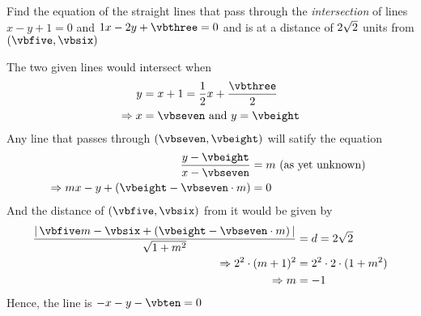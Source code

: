 \question[4] Find the equation of the straight lines that pass through the \textit{intersection} of lines 
$x-y+1 = 0$ and $\vbone x - \vbtwo y + \vbthree = 0$ and is at a distance of 
$2\sqrt{2}$ units from $(\vbfive, \vbsix)$


\watchout

\ifprintanswers

\fi 

\begin{solution}[\halfpage]
	The two given lines would intersect when
	\begin{align}
		y &= x + 1 = \dfrac{\vbone}{\vbtwo}x + \dfrac{\vbthree}{\vbtwo} \\
		\Rightarrow x &= \vbseven \text{ and } y = \vbeight
	\end{align}
	Any line that passes through $(\vbseven, \vbeight)$ will satify the equation
	\begin{align}
		\dfrac{y-\vbeight}{x-\vbseven} &= m \text{ (as yet unknown) } \\
		\Rightarrow mx - y + (\vbeight - \vbseven \cdot m) &= 0
	\end{align}
	And the distance of $(\vbfive, \vbsix)$ from it would be given by 
	\begin{align}
		\dfrac{\vert\, \vbfive m - \vbsix + (\vbeight - \vbseven\cdot m)\,\vert}{\sqrt{1 + m^2}} &= d = \vbfour\sqrt{2}\\
		\Rightarrow \vbfour^2\cdot(m+1)^2 &= \vbfour^2\cdot 2\cdot(1 + m^2) \\
		\Rightarrow m &= -1 
	\end{align}
	Hence, the line is $-x-y-\vbten = 0$
\end{solution}
